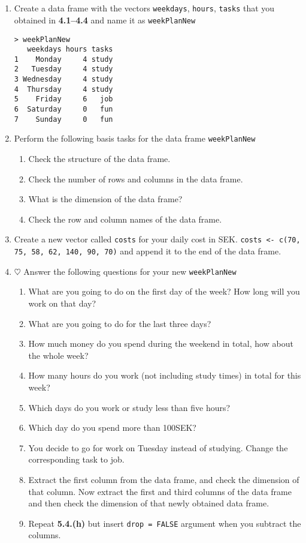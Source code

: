 \documentclass[a4paper]{article}
\begin{document}
\section{}
\begin{enumerate}
\item Create a data frame with the vectors \texttt{weekdays}, \texttt{hours},
  \texttt{tasks} that you obtained in \textbf{4.1--4.4} and name it as
  \texttt{weekPlanNew}
\begin{verbatim}
> weekPlanNew
   weekdays hours tasks
1    Monday     4 study
2   Tuesday     4 study
3 Wednesday     4 study
4  Thursday     4 study
5    Friday     6   job
6  Saturday     0   fun
7    Sunday     0   fun
\end{verbatim}

\item Perform the following basis tasks for the data frame \texttt{weekPlanNew}
  \begin{enumerate}
  \item Check the structure of the data frame.
  \item Check the number of rows and columns in the data frame.
  \item What is the dimension of the data frame?
  \item Check the row and column names of the data frame.
  \end{enumerate}

\item Create a new vector called \texttt{costs} for your daily cost in
  SEK. \texttt{costs <- c(70, 75, 58, 62, 140, 90, 70)} and append it to the
  end of the data frame.

\item $\heartsuit$ Answer the following questions for your new \texttt{weekPlanNew}
  \begin{enumerate}
  \item What are you going to do on the first day of the week? How long will
    you work on that day?
  \item What are you going to do for the last three days?
  \item How much money do you spend during the weekend in total, how about the
    whole week?
  \item How many hours do you work (not including study times) in total for this week?
  \item Which days do you work or study less than five hours?
  \item Which day do you spend more than 100SEK?
  \item You decide to go for work on Tuesday instead of studying. Change the
    corresponding task to job.
  \item Extract the first column from the data frame, and check the dimension of
    that column. Now extract the first and third columns of the data frame and then
    check the dimension of that newly obtained data frame.
  \item Repeat \textbf{5.4.(h)} but insert \texttt{drop = FALSE} argument when
    you subtract the columns.
  \end{enumerate}


\end{enumerate}
\end{document}
